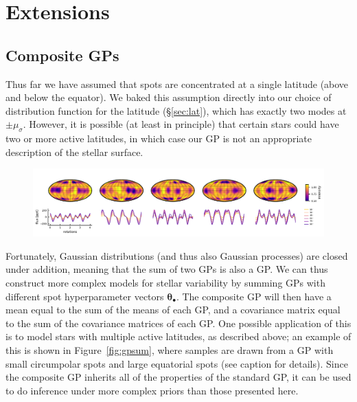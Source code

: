 \documentclass[modern]{aastex62}
\begin{document}
\section{Extensions}
\label{sec:extensions}

\subsection{Composite GPs}
\label{sec:mixture}
Thus far we have assumed that spots are concentrated at a single latitude
(above and below the equator). We baked this assumption directly into our choice of
distribution function for the latitude (\S\ref{sec:lat}), which has exactly
two modes at $\pm \mu_\sigma$. However, it is possible (at least in principle)
that certain stars could have two or more active latitudes, in which case
our GP is not an appropriate description of the stellar surface.

\begin{figure}[t!]
    \begin{centering}
        \includegraphics[width=\linewidth]{figures/gpsum.pdf}
    \end{centering}
\end{figure}

Fortunately, Gaussian distributions (and thus also Gaussian processes) are
closed under addition, meaning that the sum of two GPs is also a GP. We can thus
construct more complex models for stellar variability by summing GPs with different
spot hyperparameter vectors $\pmb{\theta}_\bullet$. The composite GP will then
have a mean equal to the sum of the means of each GP, and a covariance matrix equal
to the sum of the covariance matrices of each GP. One possible application of this
is to model stars with multiple active latitudes, as described above; an example
of this is shown in Figure~\ref{fig:gpsum}, where samples are drawn from a GP with
small circumpolar spots and large equatorial spots (see caption for details).
Since the composite GP inherits all of the properties of the standard GP, it can
be used to do inference under more complex priors than those presented here.
\end{document}
